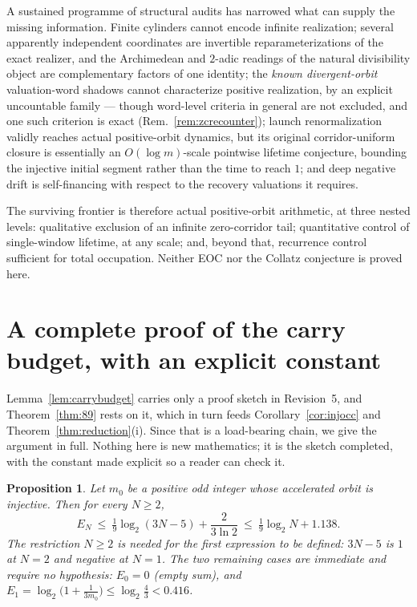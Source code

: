 \documentclass[11pt]{article}
\theoremstyle{plain}
\newtheorem{proposition}[theorem]{Proposition}
\theoremstyle{definition}
\theoremstyle{remark}
\begin{document}
A sustained programme of structural audits has narrowed what can supply the missing information.
Finite cylinders cannot encode infinite realization; several apparently independent coordinates are
invertible reparameterizations of the exact realizer, and the Archimedean and $2$-adic readings of
the natural divisibility object are complementary factors of one identity; the \emph{known divergent-orbit}
valuation-word shadows cannot characterize positive realization, by an explicit uncountable family
--- though word-level criteria in general are not excluded, and one such criterion is exact
(Rem.~\ref{rem:zcrecounter}); launch
renormalization validly reaches actual positive-orbit dynamics, but its original corridor-uniform
closure is essentially an $O(\log m)$-scale pointwise lifetime conjecture, bounding the injective
initial segment rather than the time to reach $1$; and deep negative drift is
self-financing with respect to the recovery valuations it requires.

The surviving frontier is therefore actual positive-orbit arithmetic, at three nested levels:
qualitative exclusion of an infinite zero-corridor tail; quantitative control of single-window
lifetime, at any scale; and, beyond that, recurrence control sufficient for total occupation.
Neither EOC nor the Collatz conjecture is proved here.


\appendix

\section{A complete proof of the carry budget, with an explicit constant}\label{app:carrybudget}

Lemma~\ref{lem:carrybudget} carries only a proof sketch in Revision~5, and
Theorem~\ref{thm:89} rests on it, which in turn feeds Corollary~\ref{cor:injocc} and
Theorem~\ref{thm:reduction}(i). Since that is a load-bearing chain, we give the argument in full.
Nothing here is new mathematics; it is the sketch completed, with the constant made explicit so a
reader can check it.

\begin{proposition}\label{prop:carryexplicit}
Let $m_0$ be a positive odd integer whose accelerated orbit is injective. Then for every
$N\ge2$,
\[
E_N\ \le\ \tfrac19\log_2(3N-5)+\frac{2}{3\ln2}\ \le\ \tfrac19\log_2 N+1.138 .
\]
The restriction $N\ge2$ is needed for the first expression to be defined: $3N-5$ is $1$ at $N=2$
and negative at $N=1$. The two remaining cases are immediate and require no hypothesis:
$E_0=0$ (empty sum), and $E_1=\log_2\bigl(1+\tfrac1{3m_0}\bigr)\le\log_2\tfrac43<0.416$.
\end{proposition}
\end{document}
